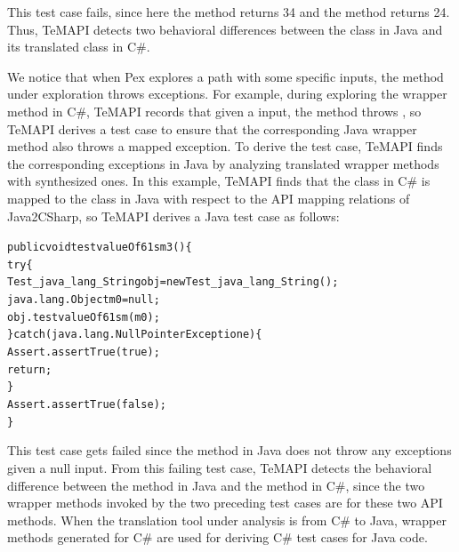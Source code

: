 This test case fails, since here the  method returns 34 and the  method returns 24. Thus, TeMAPI detects two behavioral differences between the  class in Java and its translated class in C\#.


We notice that when Pex explores a path with some specific inputs, the method under exploration throws exceptions.
For example, during exploring the  wrapper method in C\#, TeMAPI records that given a  input, the method throws , so TeMAPI derives a test case to ensure that the corresponding Java wrapper method also throws a mapped exception. To derive the test case, TeMAPI finds the corresponding exceptions in Java by analyzing translated wrapper methods with synthesized ones. In this example, TeMAPI finds that the  class in C\# is mapped to the  class in Java with respect to the API mapping relations of Java2CSharp, so TeMAPI derives a Java test case as follows:

\begin{CodeOut}\vspace*{-1.5ex}
\begin{alltt}
 public void testvalueOf61sm3()\{
   try\{
     Test_java_lang_String obj = new Test_java_lang_String();
     java.lang.Object m0 = null;
     obj.testvalueOf61sm(m0);
   \}catch(java.lang.NullPointerException e)\{
     Assert.assertTrue(true);
     return;
   \}
   Assert.assertTrue(false);
 \}
\end{alltt}
\end{CodeOut}\vspace*{-1ex}

This test case gets failed since the  method in Java does not throw any exceptions given a null input.
From this failing test case, TeMAPI detects the behavioral difference between the  method in Java and the  method in C\#, since the two wrapper methods invoked by the two preceding test cases are for these two API methods. When the translation tool under analysis is from C\# to Java, wrapper methods generated for C\# are used for deriving C\# test cases for Java code.

